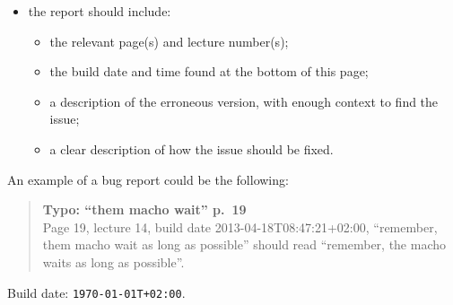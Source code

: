 \documentclass[10pt, a4paper, twoside]{lecturenotes}
\begin{document}
\begin{itemize}
\item the report should include:
\begin{itemize}
\item the relevant page(s) and lecture number(s);
\item the build date and time found at the bottom of this page;
\item a description of the erroneous version, with enough context to find the issue;
\item a clear description of how the issue should be fixed.
\end{itemize}
\end{itemize}
An example of a bug report could be the following:
\begin{quote}
\textsf{%
\textbf{Typo: ``them macho wait'' p.~19}\\
Page 19, lecture 14, build date 2013-04-18T08:47:21+02:00, ``remember, them macho wait as long as possible'' should read ``remember, the macho waits as long as possible''.
}
\end{quote}
\vfill
\begin{flushright}
Build date: \texttt{\today T\currenttime+02:00}.
\end{flushright}
\end{document}
